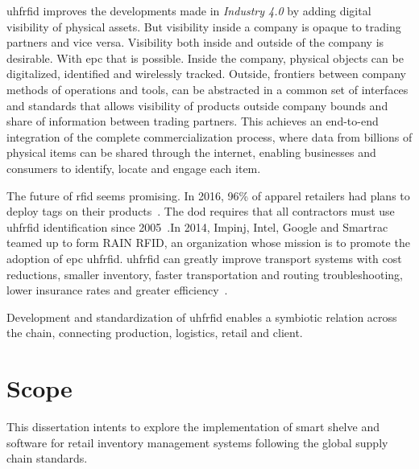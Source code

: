 \ac{uhfrfid} improves the developments made in \emph{Industry 4.0} by adding digital visibility of physical assets. But visibility inside a company is opaque to trading partners and vice versa. Visibility both inside and outside of the company is desirable. With \ac{epc} that is possible. Inside the company, physical objects can be digitalized, identified and wirelessly tracked. Outside, frontiers between company methods of operations and tools, can be abstracted in a common set of interfaces and standards that allows visibility of products outside company bounds and share of information between trading partners.
This achieves an end-to-end integration of the complete commercialization process, where data from billions of physical items can be shared through the internet, enabling businesses and consumers to identify, locate and engage each item.

The future of \ac{rfid} seems promising. In 2016, 96\% of apparel retailers had plans to deploy tags on their products~\cite{hardgrave2016StateRFID}. The \ac{dod} requires that all contractors must use \ac{uhfrfid} identification since 2005~\cite{DODReleasesFinal}.In 2014, Impinj, Intel, Google and Smartrac teamed up to form RAIN RFID, an organization whose mission is to promote the adoption of \acs{epc} \ac{uhfrfid}. \ac{uhfrfid} can greatly improve transport systems with cost reductions, smaller inventory, faster transportation and routing troubleshooting, lower insurance rates and greater efficiency~\cite{oanaRFIDTechnologyContainers2013}.

Development and standardization of \ac{uhfrfid} enables a symbiotic relation across the chain, connecting production, logistics, retail and client.

\section{Scope}

This dissertation intents to explore the implementation of smart shelve and software for retail inventory management systems following the global supply chain standards. 





